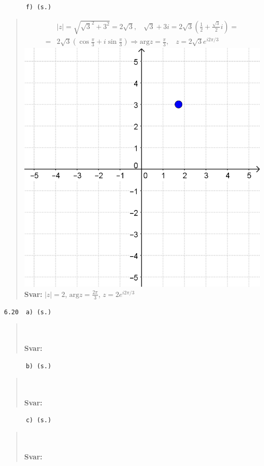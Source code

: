 \documentclass[a4paper]{article}
\newcommand{\tskcol}[1]{\textcolor{tskcol}{#1}}
\begin{document}
	\pagebreak
	\texttt{\tskcol{~~~~~~f) (s.)}}
	\begin{quotation}
		\noindent
		\begin{align*}
		&|z|=\sqrt{\sqrt{3}^2+3^2}=2\sqrt{3},~~~~ \sqrt{3}+3i=2\sqrt{3}(\frac{1}{2}+\frac{\sqrt{3}}{2}i)= \\ =
		&2\sqrt{3}(\cos\frac{\pi}{3}+i\sin\frac{\pi}{3}) \Rightarrow \text{arg}z=\frac{\pi}{3},~~~~ z=2\sqrt{3}e^{i2\pi/3}
		\end{align*}
		\includegraphics[scale=0.2]{images/619f.PNG}
		\\
		\textbf{Svar:} $|z|=2$, $\text{arg}z=\frac{2\pi}{3}$, $z=2e^{i2\pi/3}$
	\end{quotation}
	
	\texttt{\tskcol{6.20~~a) (s.)}}
	\begin{quotation}
		\noindent
		\\ \\
		\textbf{Svar:}
	\end{quotation}
	
	\texttt{\tskcol{~~~~~~b) (s.)}}
	\begin{quotation}
		\noindent
		\\ \\
		\textbf{Svar:}
	\end{quotation}
	
	\texttt{\tskcol{~~~~~~c) (s.)}}
	\begin{quotation}
		\noindent
		\\ \\
		\textbf{Svar:}
	\end{quotation}
	
\end{document}
